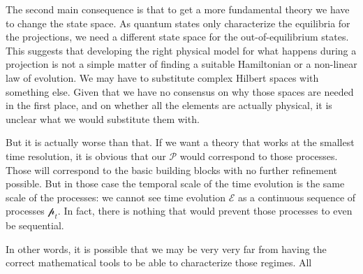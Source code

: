 \documentclass[11pt]{article}
\begin{document}
The second main consequence is that to get a more fundamental theory we have to change the state space. As quantum states only characterize the equilibria for the projections, we need a different state space for the out-of-equilibrium states. This suggests that developing the right physical model for what happens during a projection is not a simple matter of finding a suitable Hamiltonian or a non-linear law of evolution. We may have to substitute complex Hilbert spaces with something else. Given that we have no consensus on why those spaces are needed in the first place, and on whether all the elements are actually physical, it is unclear what we would substitute them with.

But it is actually worse than that. If we want a theory that works at the smallest time resolution, it is obvious that our $\mathcal{P}$ would correspond to those processes. Those will correspond to the basic building blocks with no further refinement possible. But in those case the temporal scale of the time evolution is the same scale of the processes: we cannot see time evolution $\mathcal{E}$ as a continuous sequence of processes $\mathcal{p}_t$. In fact, there is nothing that would prevent those processes to even be sequential.

In other words, it is possible that we may be very very far from having the correct mathematical tools to be able to characterize those regimes. All




\end{document}
